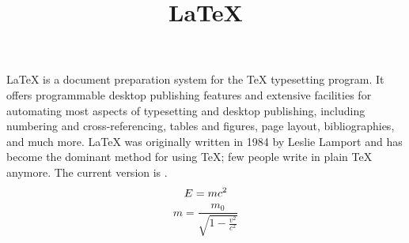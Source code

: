 \documentclass{article}
\title{\LaTeX}
\date{}
\begin{document}
  \maketitle
  \LaTeX{} is a document preparation system for the \TeX{}
  typesetting program. It offers programmable desktop publishing
  features and extensive facilities for automating most aspects of
  typesetting and desktop publishing, including numbering and
  cross-referencing, tables and figures, page layout, bibliographies,
  and much more. \LaTeX{} was originally written in 1984 by Leslie
  Lamport and has become the dominant method for using \TeX; few
  people write in plain \TeX{} anymore. The current version  is
  \LaTeXe.
\begin{equation*}
    E = mc^2                              \\
\end{equation*}
\begin{equation*}
    m = \frac{m_0}{\sqrt{1-\frac{v^2}{c^2}}}
\end{equation*}
\end{document}

